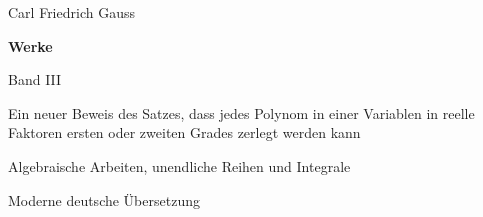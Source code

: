 \begin{titlepage}\centering
{\Large Carl Friedrich Gauss\par}\bigskip
{\LARGE\bfseries Werke\par}\bigskip
{\Large Band III\par}\bigskip
{\large Ein neuer Beweis des Satzes, dass jedes Polynom in einer Variablen in reelle Faktoren ersten oder zweiten Grades zerlegt werden kann\par}\bigskip
{\large Algebraische Arbeiten, unendliche Reihen und Integrale\par}\bigskip
Moderne deutsche Übersetzung\par\bigskip
\end{titlepage}
\clearpage\thispagestyle{empty}\medskip
\begingroup\fontsize{9}{9.7}\selectfont\raggedright
